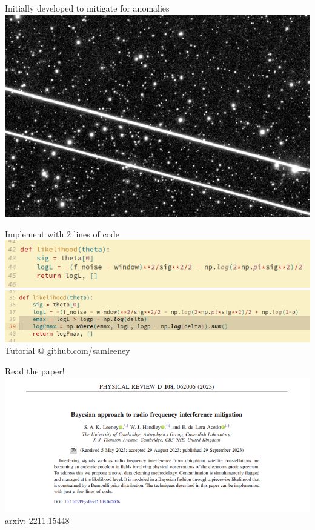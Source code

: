 \documentclass{beamer}
\begin{document}
    \begin{frame}{Initially developed to mitigate for anomalies}
      \includegraphics[width=1\textwidth]{starlink2.png}
    \end{frame}

    \begin{frame}{Implement with 2 lines of code}
        \includegraphics[width=1\textwidth]{logl1.png}
        \includegraphics[width=1\textwidth]{logl2.png}
        \centering Tutorial @ github.com/samleeney
    \end{frame}

    \begin{frame}{Read the paper!}
      \includegraphics[width=1\textwidth]{paper1.png}
      \href{https://arxiv.org/abs/2211.15448}{arxiv: 2211.15448}
    \end{frame}
\end{document}
